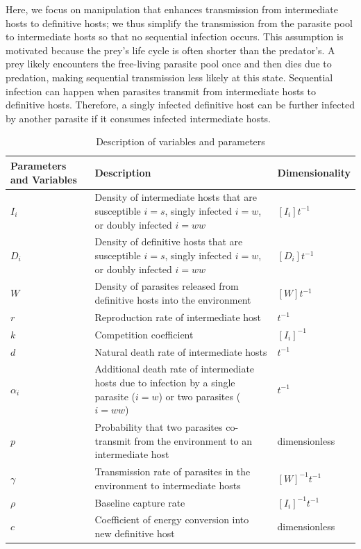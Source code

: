 \documentclass[a4paper]{scrartcl}
\begin{document}
Here, we focus on manipulation that enhances transmission from intermediate hosts to definitive hosts; we thus simplify the transmission from the parasite pool to intermediate hosts so that no sequential infection occurs. 
This assumption is motivated because the prey's life cycle is often shorter than the predator's. 
A prey likely encounters the free-living parasite pool once and then dies due to predation, making sequential transmission less likely at this state.
Sequential infection can happen when parasites transmit from intermediate hosts to definitive hosts. 
Therefore, a singly infected definitive host can be further infected by another parasite if it consumes infected intermediate hosts. 
%

\begin{table}[!ht]
\caption{Description of variables and parameters}
\label{table:varpardescription}
\centering
\begin{tabular}{p{2cm}|p{10cm}|p{3cm}}
\hline
Parameters and Variables    &  Description & Dimensionality \\
\hline
$I_i$  & Density of intermediate hosts that are susceptible $i=s$, singly infected $i=w$, or doubly infected $i=ww$ & $[I_i] t^{-1}$\\
\hline
$D_i$ & Density of definitive hosts that are susceptible $i=s$, singly infected $i=w$, or doubly infected $i=ww$ & $[D_i]  t^{-1}$ \\
\hline
$W$ & Density of parasites released from definitive hosts into the environment & $[W]  t^{-1}$\\
\hline
$r$ & Reproduction rate of intermediate host & $t^{-1}$ \\
\hline
$k$ & Competition coefficient & $[I_i]^{-1}$ \\
\hline
$d$ & Natural death rate of intermediate hosts & $t^{-1}$\\
\hline
$\alpha_i$ & Additional death rate of intermediate hosts due to infection by a single parasite ($i = w$) or two parasites ($i = ww$) & $t^{-1}$ \\
\hline
$p$ & Probability that two parasites co-transmit from the environment to an intermediate host  & dimensionless\\
\hline
$\gamma$ & Transmission rate of parasites in the environment to intermediate hosts &  $[W]^{-1} t^{-1}$ \\
\hline
$\rho$ & Baseline capture rate & $[I_i]^{-1} t^{-1}$ \\
\hline
$c$ & Coefficient of energy conversion into new definitive host & dimensionless \\

\end{tabular}
\end{table}
\end{document}
